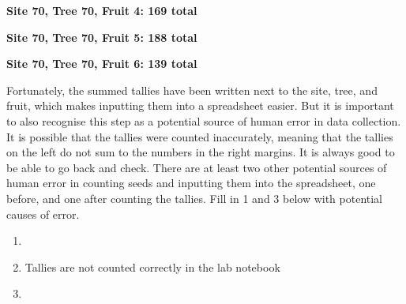 \documentclass[
  openany]{scrbook}
\providecommand{\tightlist}{%
  \setlength{\itemsep}{0pt}\setlength{\parskip}{0pt}}
\begin{document}
\textbf{Site 70, Tree 70, Fruit 4: 169 total}

\StrokeFive\StrokeFive\StrokeFive\StrokeFive\StrokeFive\StrokeFive\StrokeFive\StrokeFive\StrokeFive\StrokeFive\StrokeFive\StrokeFive\StrokeFive\StrokeFive\StrokeFive\StrokeFive\StrokeFive\StrokeFive\StrokeFive\StrokeFive

\StrokeFive\StrokeFive\StrokeFive\StrokeFive\StrokeFive\StrokeFive\StrokeFive\StrokeFive\StrokeFive\StrokeFive\StrokeFive\StrokeFive\StrokeFive\StrokeFour

\textbf{Site 70, Tree 70, Fruit 5: 188 total}

\StrokeFive\StrokeFive\StrokeFive\StrokeFive\StrokeFive\StrokeFive\StrokeFive\StrokeFive\StrokeFive\StrokeFive\StrokeFive\StrokeFive\StrokeFive\StrokeFive\StrokeFive\StrokeFive\StrokeFive\StrokeFive\StrokeFive\StrokeFive

\StrokeFive\StrokeFive\StrokeFive\StrokeFive\StrokeFive\StrokeFive\StrokeFive\StrokeFive\StrokeFive\StrokeFive\StrokeFive\StrokeFive\StrokeFive\StrokeFive\StrokeFive\StrokeFive\StrokeFive\StrokeThree

\textbf{Site 70, Tree 70, Fruit 6: 139 total}

\StrokeFive\StrokeFive\StrokeFive\StrokeFive\StrokeFive\StrokeFive\StrokeFive\StrokeFive\StrokeFive\StrokeFive\StrokeFive\StrokeFive\StrokeFive\StrokeFive\StrokeFive\StrokeFive\StrokeFive\StrokeFive\StrokeFive\StrokeFive

\StrokeFive\StrokeFive\StrokeFive\StrokeFive\StrokeFive\StrokeFive\StrokeFive\StrokeFour

Fortunately, the summed tallies have been written next to the site, tree, and fruit, which makes inputting them into a spreadsheet easier.
But it is important to also recognise this step as a potential source of human error in data collection.
It is possible that the tallies were counted inaccurately, meaning that the tallies on the left do not sum to the numbers in the right margins.
It is always good to be able to go back and check.
There are at least two other potential sources of human error in counting seeds and inputting them into the spreadsheet, one before, and one after counting the tallies.
Fill in 1 and 3 below with potential causes of error.

\begin{enumerate}
\def\labelenumi{\arabic{enumi}.}
\tightlist
\item
\item
  Tallies are not counted correctly in the lab notebook
\item
\end{enumerate}
\end{document}
